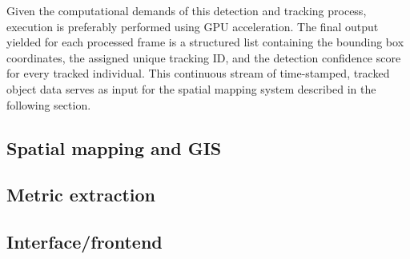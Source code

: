 Given the computational demands of this detection and tracking process, execution is preferably performed using GPU acceleration. The final output yielded for each processed frame is a structured list containing the bounding box coordinates, the assigned unique tracking ID, and the detection confidence score for every tracked individual. This continuous stream of time-stamped, tracked object data serves as input for the spatial mapping system described in the following section.

\subsection{Spatial mapping and GIS}
\label{sec:spatial_mapping}

\subsection{Metric extraction}
\label{sec:metric_extraction}

\subsection{Interface/frontend}
